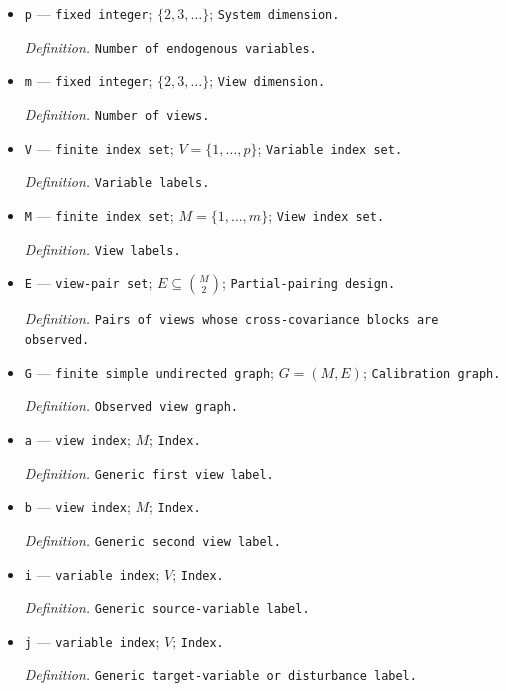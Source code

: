 \documentclass{article}
\begin{document}
\begin{itemize}
  \item \texttt{p} --- \texttt{fixed integer}; \(\{2,3,\ldots\}\); \texttt{System dimension.}
  \par\smallskip\noindent\emph{Definition.} \texttt{Number of endogenous variables.}
  \item \texttt{m} --- \texttt{fixed integer}; \(\{2,3,\ldots\}\); \texttt{View dimension.}
  \par\smallskip\noindent\emph{Definition.} \texttt{Number of views.}
  \item \texttt{V} --- \texttt{finite index set}; \(V=\{1,\ldots,p\}\); \texttt{Variable index set.}
  \par\smallskip\noindent\emph{Definition.} \texttt{Variable labels.}
  \item \texttt{M} --- \texttt{finite index set}; \(M=\{1,\ldots,m\}\); \texttt{View index set.}
  \par\smallskip\noindent\emph{Definition.} \texttt{View labels.}
  \item \texttt{E} --- \texttt{view-\allowbreak{}pair set}; \(E\subseteq\binom{M}{2}\); \texttt{Partial-\allowbreak{}pairing design.}
  \par\smallskip\noindent\emph{Definition.} \texttt{Pairs of views whose cross-\allowbreak{}covariance blocks are observed.}
  \item \texttt{G} --- \texttt{finite simple undirected graph}; \(G=(M,E)\); \texttt{Calibration graph.}
  \par\smallskip\noindent\emph{Definition.} \texttt{Observed view graph.}
  \item \texttt{a} --- \texttt{view index}; \(M\); \texttt{Index.}
  \par\smallskip\noindent\emph{Definition.} \texttt{Generic first view label.}
  \item \texttt{b} --- \texttt{view index}; \(M\); \texttt{Index.}
  \par\smallskip\noindent\emph{Definition.} \texttt{Generic second view label.}
  \item \texttt{i} --- \texttt{variable index}; \(V\); \texttt{Index.}
  \par\smallskip\noindent\emph{Definition.} \texttt{Generic source-\allowbreak{}variable label.}
  \item \texttt{j} --- \texttt{variable index}; \(V\); \texttt{Index.}
  \par\smallskip\noindent\emph{Definition.} \texttt{Generic target-\allowbreak{}variable or disturbance label.}

\end{itemize}
\end{document}
